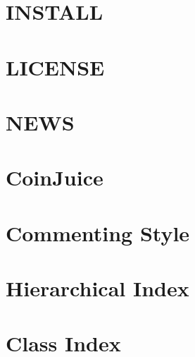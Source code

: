 \documentclass[twoside]{book}
\begin{document}
\chapter{I\-N\-S\-T\-A\-L\-L}
\label{md__i_n_s_t_a_l_l}
\hypertarget{md__i_n_s_t_a_l_l}{}

\chapter{L\-I\-C\-E\-N\-S\-E}
\label{md__l_i_c_e_n_s_e}
\hypertarget{md__l_i_c_e_n_s_e}{}

\chapter{N\-E\-W\-S}
\label{md__n_e_w_s}
\hypertarget{md__n_e_w_s}{}

\chapter{Coin\-Juice}
\label{md__r_e_a_d_m_e}
\hypertarget{md__r_e_a_d_m_e}{}

\chapter{Commenting Style}
\label{md__s_t_y_l_e}
\hypertarget{md__s_t_y_l_e}{}

\chapter{Hierarchical Index}

\chapter{Class Index}

\end{document}
